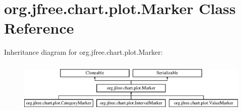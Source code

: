 \hypertarget{classorg_1_1jfree_1_1chart_1_1plot_1_1_marker}{}\section{org.\+jfree.\+chart.\+plot.\+Marker Class Reference}
\label{classorg_1_1jfree_1_1chart_1_1plot_1_1_marker}
Inheritance diagram for org.\+jfree.\+chart.\+plot.\+Marker\+:\begin{figure}[H]
\begin{center}
\leavevmode
\includegraphics[height=2.511211cm]{classorg_1_1jfree_1_1chart_1_1plot_1_1_marker}
\end{center}
\end{figure}
